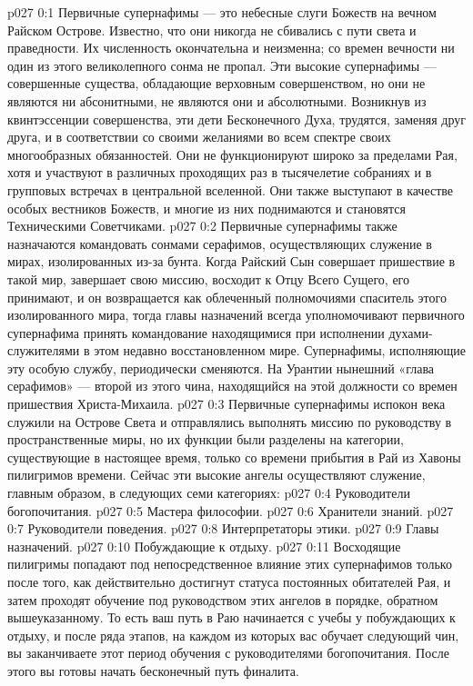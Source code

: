 \author{Совершенствователь Мудрости}
\vs p027 0:1 Первичные супернафимы --- это небесные слуги Божеств на вечном Райском Острове. Известно, что они никогда не сбивались с пути света и праведности. Их численность окончательна и неизменна; со времен вечности ни один из этого великолепного сонма не пропал. Эти высокие супернафимы --- совершенные существа, обладающие верховным совершенством, но они не являются ни абсонитными, не являются они и абсолютными. Возникнув из квинтэссенции совершенства, эти дети Бесконечного Духа, трудятся, заменяя друг друга, и в соответствии со своими желаниями во всем спектре своих многообразных обязанностей. Они не функционируют широко за пределами Рая, хотя и участвуют в различных проходящих раз в тысячелетие собраниях и в групповых встречах в центральной вселенной. Они также выступают в качестве особых вестников Божеств, и многие из них поднимаются и становятся Техническими Советчиками.
\vs p027 0:2 Первичные супернафимы также назначаются командовать сонмами серафимов, осуществляющих служение в мирах, изолированных из\hyp{}за бунта. Когда Райский Сын совершает пришествие в такой мир, завершает свою миссию, восходит к Отцу Всего Сущего, его принимают, и он возвращается как облеченный полномочиями спаситель этого изолированного мира, тогда главы назначений всегда уполномочивают первичного супернафима принять командование находящимися при исполнении духами\hyp{}служителями в этом недавно восстановленном мире. Супернафимы, исполняющие эту особую службу, периодически сменяются. На Урантии нынешний «глава серафимов» --- второй из этого чина, находящийся на этой должности со времен пришествия Христа\hyp{}Михаила.
\vs p027 0:3 Первичные супернафимы испокон века служили на Острове Света и отправлялись выполнять миссию по руководству в пространственные миры, но их функции были разделены на категории, существующие в настоящее время, только со времени прибытия в Рай из Хавоны пилигримов времени. Сейчас эти высокие ангелы осуществляют служение, главным образом, в следующих семи категориях:
\vs p027 0:4 \bibnobreakspace Руководители богопочитания.
\vs p027 0:5 \bibnobreakspace Мастера философии.
\vs p027 0:6 \bibnobreakspace Хранители знаний.
\vs p027 0:7 \bibnobreakspace Руководители поведения.
\vs p027 0:8 \bibnobreakspace Интерпретаторы этики.
\vs p027 0:9 \bibnobreakspace Главы назначений.
\vs p027 0:10 \bibnobreakspace Побуждающие к отдыху.
\vs p027 0:11 Восходящие пилигримы попадают под непосредственное влияние этих супернафимов только после того, как действительно достигнут статуса постоянных обитателей Рая, и затем проходят обучение под руководством этих ангелов в порядке, обратном вышеуказанному. То есть ваш путь в Раю начинается с учебы у побуждающих к отдыху, и после ряда этапов, на каждом из которых вас обучает следующий чин, вы заканчиваете этот период обучения с руководителями богопочитания. После этого вы готовы начать бесконечный путь финалита.
